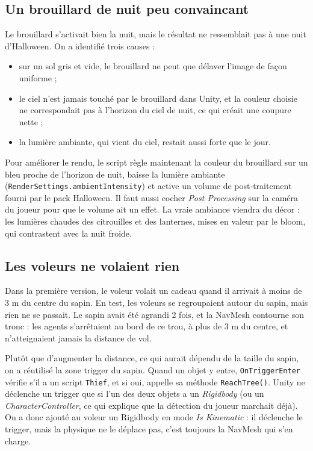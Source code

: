 \documentclass[11pt,a4paper]{article}
\begin{document}
\subsection{Un brouillard de nuit peu convaincant}
Le brouillard s'activait bien la nuit, mais le résultat ne ressemblait pas à une nuit d'Halloween. On a identifié trois causes :
\begin{itemize}
  \item sur un sol gris et vide, le brouillard ne peut que délaver l'image de façon uniforme ;
  \item le ciel n'est jamais touché par le brouillard dans Unity, et la couleur choisie ne correspondait pas à l'horizon du ciel de nuit, ce qui créait une coupure nette ;
  \item la lumière ambiante, qui vient du ciel, restait aussi forte que le jour.
\end{itemize}
Pour améliorer le rendu, le script règle maintenant la couleur du brouillard sur un bleu proche de l'horizon de nuit, baisse la lumière ambiante (\texttt{RenderSettings.ambientIntensity}) et active un volume de post-traitement fourni par le pack Halloween. Il faut aussi cocher \emph{Post Processing} sur la caméra du joueur pour que le volume ait un effet. La vraie ambiance viendra du décor : les lumières chaudes des citrouilles et des lanternes, mises en valeur par le bloom, qui contrastent avec la nuit froide.

\subsection{Les voleurs ne volaient rien}
Dans la première version, le voleur volait un cadeau quand il arrivait à moins de 3 m du centre du sapin. En test, les voleurs se regroupaient autour du sapin, mais rien ne se passait. Le sapin avait été agrandi 2 fois, et la NavMesh contourne son tronc : les agents s'arrêtaient au bord de ce trou, à plus de 3 m du centre, et n'atteignaient jamais la distance de vol.

Plutôt que d'augmenter la distance, ce qui aurait dépendu de la taille du sapin, on a réutilisé la zone trigger du sapin. Quand un objet y entre, \texttt{OnTriggerEnter} vérifie s'il a un script \texttt{Thief}, et si oui, appelle sa méthode \texttt{ReachTree()}. Unity ne déclenche un trigger que si l'un des deux objets a un \emph{Rigidbody} (ou un \emph{CharacterController}, ce qui explique que la détection du joueur marchait déjà). On a donc ajouté au voleur un Rigidbody en mode \emph{Is Kinematic} : il déclenche le trigger, mais la physique ne le déplace pas, c'est toujours la NavMesh qui s'en charge.
\end{document}
